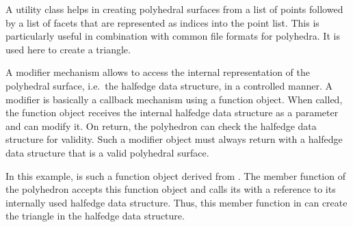 \begin{ccAdvanced}

A utility class  helps in
creating polyhedral surfaces from a list of points followed by a list
of facets that are represented as indices into the point list. This is
particularly useful in combination with common file formats for
polyhedra.  It is used here to create a triangle.

A modifier mechanism allows to access the internal representation of
the polyhedral surface, i.e.~the halfedge data structure, in a
controlled manner. A modifier is basically a callback mechanism using
a function object. When called, the function object receives the
internal halfedge data structure as a parameter and can modify it.  On
return, the polyhedron can check the halfedge data structure for
validity. Such a modifier object must always return with a halfedge
data structure that is a valid polyhedral surface.

In this example,  is such a function object
derived from . The  member
function of the polyhedron accepts this function object and calls its
 with a reference to its internally used halfedge data
structure. Thus, this member function in  can
create the triangle in the halfedge data structure.


\end{ccAdvanced}






